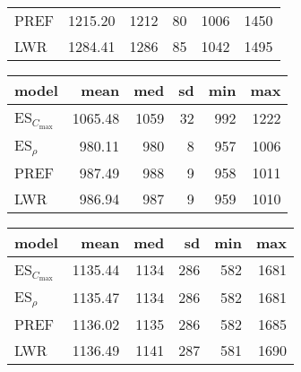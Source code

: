 \begin{table}[]
{\begin{tabular}{lrrrrr}
            PREF&  1215.20 & 1212 & 80 & 1006 & 1450  \\ %
            LWR &  1284.41 & 1286 & 85 & 1042 & 1495   \\ %
            \bottomrule \end{tabular}}
    \quad
    {
        \begin{tabular}{lrrrrr} \toprule
            model&mean & med & sd & min & max \\   \midrule
            ES$_{C_{\max}}$& 1065.48 & 1059 & 32 & 992 & 1222   \\ %
            ES$_\rho$& 980.11 & 980 &  8 & 957 & 1006   \\ %
            PREF&  987.49 & 988 &  9 & 958 & 1011  \\ %
            LWR &  986.94 & 987 &  9 & 959 & 1010   \\ %
            \bottomrule \end{tabular}}
    \quad
    {
        \begin{tabular}{lrrrrr} \toprule
            model&mean & med & sd & min & max \\   \midrule
            ES$_{C_{\max}}$& 1135.44 & 1134 & 286 & 582 & 1681   \\ %
            ES$_\rho$& 1135.47 & 1134 & 286 & 582 & 1681   \\ %
            PREF&   1136.02 & 1135 & 286 & 582 & 1685 \\  %
            LWR &  1136.49 & 1141 & 287 & 581 & 1690   \\ %
            \bottomrule \end{tabular}}
\end{table}
